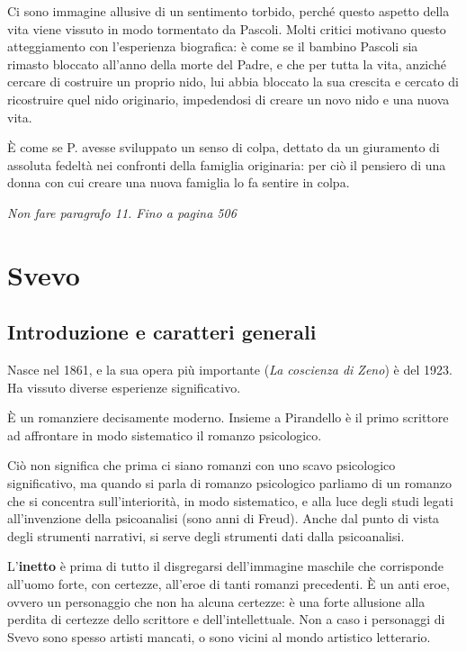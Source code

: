 Ci sono immagine allusive di un sentimento torbido, perché questo aspetto della vita viene vissuto in modo tormentato da Pascoli. Molti critici motivano questo atteggiamento con l'esperienza biografica: è come se il bambino Pascoli sia rimasto bloccato all'anno della morte del Padre, e che per tutta la vita, anziché cercare di costruire un proprio nido, lui abbia bloccato la sua crescita e cercato di ricostruire quel nido originario, impedendosi di creare un novo nido e una nuova vita.

È come se P. avesse sviluppato un senso di colpa, dettato da un giuramento di assoluta fedeltà nei confronti della famiglia originaria: per ciò il pensiero di una donna con cui creare una nuova famiglia lo fa sentire in colpa.

\emph{Non fare paragrafo 11. Fino a pagina 506}

\part{Svevo}

\chapter{Introduzione e caratteri generali}


Nasce nel 1861, e la sua opera più importante (\textit{La coscienza di Zeno}) è del 1923.
Ha vissuto diverse esperienze significativo.

È un romanziere decisamente moderno. Insieme a Pirandello è il primo scrittore ad affrontare in modo sistematico il romanzo psicologico.

Ciò non significa che prima ci siano romanzi con uno scavo psicologico significativo, ma quando si parla di romanzo psicologico parliamo di un romanzo che si concentra sull'interiorità, in modo sistematico, e alla luce degli studi legati all'invenzione della psicoanalisi (sono anni di Freud). Anche dal punto di vista degli strumenti narrativi, si serve degli strumenti dati dalla psicoanalisi.

L'\textbf{inetto} è prima di tutto il disgregarsi dell'immagine maschile che corrisponde all'uomo forte, con certezze, all'eroe di tanti romanzi precedenti.
È un anti eroe, ovvero un personaggio che non ha alcuna certezze: è una forte allusione alla perdita di certezze dello scrittore e dell'intellettuale.
Non a caso i personaggi di Svevo sono spesso artisti mancati, o sono vicini al mondo artistico letterario.

